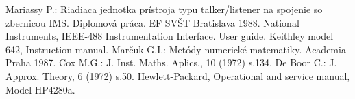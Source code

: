\begin{thebibliography}{}
 Mariassy P.: Riadiaca jednotka prístroja typu
  talker/listener na spojenie so zbernicou IMS\@. Diplomová práca. EF
  SVŠT Bratislava 1988.
 National Instruments, IEEE-488 Instrumentation
  Interface. User guide.
 Keithley model 642, Instruction manual.
 Marčuk G.I.: Metódy numerické matematiky. Academia
  Praha 1987.
 Cox M.G.: J. Inst. Maths. Aplics., 10 (1972) s.134.
 De Boor C.: J. Approx. Theory, 6 (1972) s.50.
 Hewlett-Packard, Operational and service manual,
  Model HP4280a.
\end{thebibliography}
